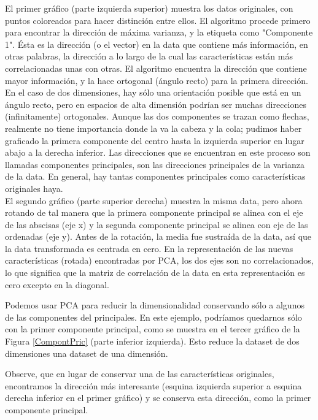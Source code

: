 El primer gráfico (parte izquierda superior) muestra los datos originales, con puntos coloreados para hacer 
distinción entre ellos.   El algoritmo procede  primero para encontrar la dirección de máxima varianza, y la
etiqueta  como  "{}Componente 1{}". { }  Ésta es la dirección (o el vector) en la data que contiene más información, en otras palabras, la dirección a lo largo de la cual las características están más  correlacionadas unas con otras. El algoritmo encuentra la dirección que contiene  mayor  información,  y la hace  ortogonal (ángulo recto) para la primera dirección. En el caso de dos dimensiones, hay sólo una orientación posible que está en un ángulo recto, pero en espacios de  alta  dimensión podrían ser  muchas direcciones  (infinitamente) ortogonales.   Aunque las dos componentes se trazan como flechas, realmente no tiene importancia donde la va la cabeza y la cola;  pudimos haber  graficado la primera  componente del centro  hasta la izquierda superior en lugar abajo a la derecha inferior.  Las direcciones que se encuentran  en  este proceso son  llamadas  componentes principales,  son las direcciones principales de la varianza de  la  data. En general, hay tantas componentes principales como características originales haya.\\


El segundo gráfico (parte superior derecha) muestra la misma data, pero ahora rotando de tal manera que la primera componente principal se alinea con el eje de las abscisas (eje x) y la segunda componente principal se alinea con eje de las ordenadas (eje y).  Antes de la rotación,  la media fue sustraída de la data, así que la data transformada es centrada  en cero. En la representación de las nuevas características (rotada) encontradas por PCA, los dos ejes  son no correlacionados, lo que significa que  la matriz de correlación de la data en esta representación es cero excepto en  la diagonal.

Podemos usar  PCA  para  reducir la  dimensionalidad conservando sólo a algunos de las componentes del principales.   En este ejemplo, podríamos quedarnos sólo con la primer componente principal, como se 
muestra en el tercer gráfico de la Figura \ref{CompontPric} (parte inferior izquierda). Esto reduce la dataset de dos dimensiones una  dataset de una  dimensión.  

Observe,  que en lugar de conservar  una de las características originales, encontramos la dirección más interesante (esquina izquierda superior  a esquina derecha inferior en el primer gráfico) y se conserva esta dirección, como la primer componente principal. \\


